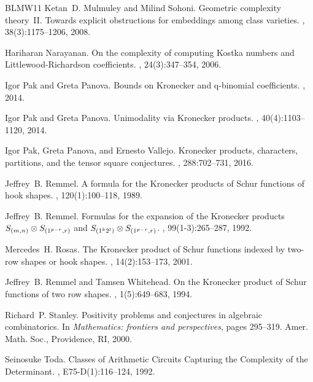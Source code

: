 \documentclass{article}
\numberwithin{equation}{section}
\theoremstyle{definition}
\begin{document}
\begin{thebibliography}{BLMW11}
Ketan~D. Mulmuley and Milind Sohoni.
\newblock Geometric complexity theory~{II}. {T}owards explicit obstructions for
  embeddings among class varieties.
, 38(3):1175--1206, 2008.

Hariharan Narayanan.
\newblock On the complexity of computing {K}ostka numbers and
  {L}ittlewood-{R}ichardson coefficients.
, 24(3):347--354, 2006.

Igor Pak and Greta Panova.
\newblock Bounds on {K}ronecker and q-binomial coefficients.
, 2014.

Igor Pak and Greta Panova.
\newblock Unimodality via {K}ronecker products.
, 40(4):1103--1120, 2014.

Igor Pak, Greta Panova, and Ernesto Vallejo.
\newblock Kronecker products, characters, partitions, and the tensor square
  conjectures.
, 288:702--731, 2016.

Jeffrey~B. Remmel.
\newblock A formula for the {K}ronecker products of {S}chur functions of hook
  shapes.
, 120(1):100--118, 1989.

Jeffrey~B. Remmel.
\newblock Formulas for the expansion of the {K}ronecker products {$S\sb
  {(m,n)}\otimes S\sb {(1\sp {p-r},r)}$} and {$S\sb {(1\sp k2\sp l)}\otimes
  S\sb {(1\sp {p-r},r)}$}.
, 99(1-3):265--287, 1992.

Mercedes~H. Rosas.
\newblock The {K}ronecker product of {S}chur functions indexed by two-row
  shapes or hook shapes.
, 14(2):153--173, 2001.

Jeffrey~B. Remmel and Tamsen Whitehead.
\newblock On the {K}ronecker product of {S}chur functions of two row shapes.
, 1(5):649--683, 1994.

Richard~P. Stanley.
\newblock Positivity problems and conjectures in algebraic combinatorics.
\newblock In {\em Mathematics: frontiers and perspectives}, pages 295--319.
  Amer. Math. Soc., Providence, RI, 2000.

Seinosuke Toda.
\newblock Classes of {A}rithmetic {C}ircuits {C}apturing the {C}omplexity of
  the {D}eterminant.
, E75-D(1):116--124, 1992.


\end{thebibliography}
\end{document}

